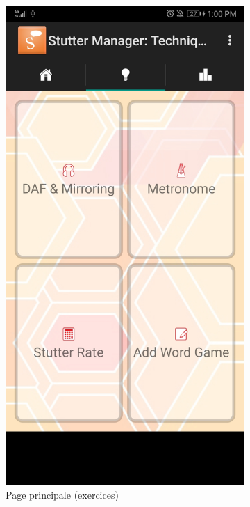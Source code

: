\begin{appendices}
\begin{landscape}
\begin{figure}[h]
  \centering
  \begin{subfigure}{.25\textwidth}
    \centering
    \includegraphics[width=.75\linewidth]{content/imgs/old_app_1.jpg}
    \caption{Page principale (exercices)}
  \end{subfigure}%
  \begin{subfigure}{.25\textwidth}
    \centering

\end{subfigure}
\end{figure}
\end{landscape}
\end{appendices}
